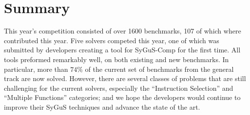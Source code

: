 \section{Summary}
\label{sec:discussion}

This year's competition consisted of over 1600 benchmarks,
107 of which where contributed this year.
Five solvers competed this year, one of which was submitted by developers creating a tool for SyGuS-Comp for the first time.
All tools preformed remarkably well, on both existing and new benchmarks.
In particular, more than $74$\% of the current set of benchmarks from the general track are now solved.
However, there are several classes of problems that are still challenging for the current solvers,
especially the ``Instruction Selection'' and ``Multiple Functions'' categories;
and we hope the developers would continue to improve their SyGuS techniques and advance the state of the art.